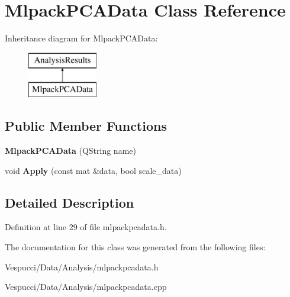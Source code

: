 \hypertarget{class_mlpack_p_c_a_data}{}\section{Mlpack\+P\+C\+A\+Data Class Reference}
\label{class_mlpack_p_c_a_data}
Inheritance diagram for Mlpack\+P\+C\+A\+Data\+:\begin{figure}[H]
\begin{center}
\leavevmode
\includegraphics[height=2.000000cm]{class_mlpack_p_c_a_data}
\end{center}
\end{figure}
\subsection*{Public Member Functions}
\begin{DoxyCompactItemize}
\item 
{\bfseries Mlpack\+P\+C\+A\+Data} (Q\+String name)\hypertarget{class_mlpack_p_c_a_data_ac130d5fe6cf24f2ec5ba52123ad05bcc}{}\label{class_mlpack_p_c_a_data_ac130d5fe6cf24f2ec5ba52123ad05bcc}

\item 
void {\bfseries Apply} (const mat \&data, bool scale\+\_\+data)\hypertarget{class_mlpack_p_c_a_data_a5dbb680a606b911a40d33e4a8b8f9ef9}{}\label{class_mlpack_p_c_a_data_a5dbb680a606b911a40d33e4a8b8f9ef9}

\end{DoxyCompactItemize}


\subsection{Detailed Description}


Definition at line 29 of file mlpackpcadata.\+h.



The documentation for this class was generated from the following files\+:\begin{DoxyCompactItemize}
\item 
Vespucci/\+Data/\+Analysis/mlpackpcadata.\+h\item 
Vespucci/\+Data/\+Analysis/mlpackpcadata.\+cpp\end{DoxyCompactItemize}
